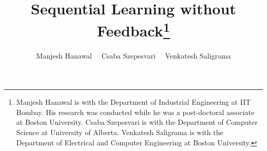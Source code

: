 \documentclass[11pt]{article} %
\begin{document}
%

%
\title{Sequential Learning without Feedback\thanks{Manjesh Hanawal is with the Department of Industrial Engineering at IIT Bombay. His research was conducted while he was a post-doctoral associate at Boston University. Csaba Szepesvari is with the Department of Computer Science at University of Alberta. Venkatesh Saligrama is with the Department of Electrical and Computer Engineering at Boston University.}}
\author{Manjesh Hanawal \,\,\,\, Csaba Szepesvari \,\,\,\, Venkatesh Saligrama}


\end{document}
